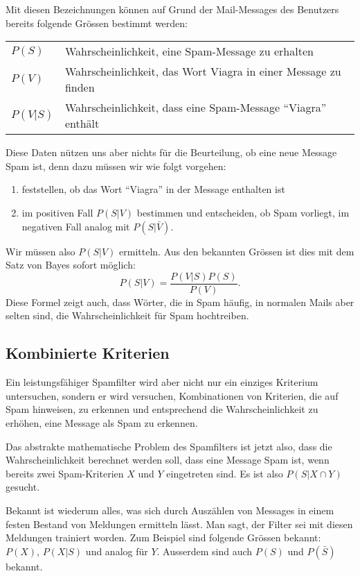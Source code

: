 Mit diesen Bezeichnungen können auf Grund der Mail-Messages des Benutzers
bereits folgende Grössen bestimmt werden:
\begin{center}
\begin{tabular}{ll}
$P(S)$&Wahrscheinlichkeit, eine Spam-Message zu erhalten\\
$P(V)$&Wahrscheinlichkeit, das Wort Viagra in einer Message zu finden\\
$P(V|S)$&Wahrscheinlichkeit, dass eine Spam-Message ``Viagra'' enthält\\
\end{tabular}
\end{center}
Diese Daten nützen uns aber nichts für die Beurteilung, ob eine neue
Message Spam ist, denn dazu müssen wir wie folgt vorgehen:
\begin{enumerate}
\item feststellen, ob das Wort ``Viagra'' in der Message enthalten ist
\item im positiven Fall $P(S|V)$ bestimmen und entscheiden, ob Spam vorliegt,
im negativen Fall analog mit $P(S|\bar V)$.
\end{enumerate}
Wir müssen also $P(S|V)$ ermitteln.
Aus den bekannten Grössen ist dies
mit dem Satz von Bayes sofort möglich:
\begin{equation}
P(S|V)=\frac{P(V|S)P(S)}{P(V)}.
\end{equation}
Diese Formel zeigt auch, dass Wörter, die in Spam häufig, in normalen
Mails aber selten sind, die Wahrscheinlichkeit für Spam hochtreiben.

\subsection{Kombinierte Kriterien}
Ein leistungsfähiger Spamfilter wird aber nicht nur ein einziges Kriterium
untersuchen, sondern er wird versuchen, Kombinationen von Kriterien, die
auf Spam hinweisen, zu erkennen und entsprechend die Wahrscheinlichkeit
zu erhöhen, eine Message als Spam zu erkennen.

Das abstrakte mathematische Problem des Spamfilters ist jetzt also,
dass die Wahrscheinlichkeit berechnet werden soll, dass eine Message
Spam ist, wenn bereits zwei Spam-Kriterien $X$ und $Y$ eingetreten
sind.
Es ist also $P(S|X\cap Y)$ gesucht.

Bekannt ist wiederum alles, was sich durch Auszählen von Messages
in einem festen Bestand von Meldungen ermitteln lässt.
Man sagt, der Filter sei mit diesen Meldungen trainiert worden.
Zum Beispiel
sind folgende Grössen bekannt: $P(X)$, $P(X|S)$ und analog für $Y$.
Ausserdem sind auch $P(S)$ und $P(\bar S)$ bekannt.

